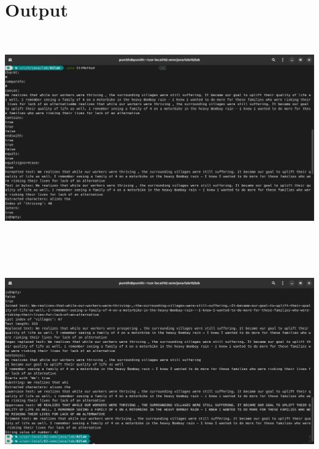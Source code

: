 \documentclass{article}
\begin{document}
\section*{Output}
\includegraphics[width=14cm, height=9cm]{./images/01.png}\\\\
\includegraphics[width=14cm, height=9cm]{./images/02.png}
\end{document}
